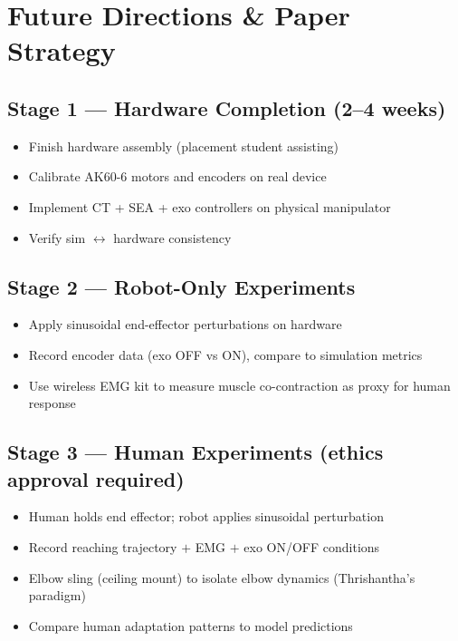 \documentclass[11pt, a4paper]{article}
\begin{document}
\section{Future Directions \& Paper Strategy}

\subsection{Stage 1 --- Hardware Completion (2--4 weeks)}
\begin{itemize}[nosep]
  \item Finish hardware assembly (placement student assisting)
  \item Calibrate AK60-6 motors and encoders on real device
  \item Implement CT + SEA + exo controllers on physical manipulator
  \item Verify sim $\leftrightarrow$ hardware consistency
\end{itemize}

\subsection{Stage 2 --- Robot-Only Experiments}
\begin{itemize}[nosep]
  \item Apply sinusoidal end-effector perturbations on hardware
  \item Record encoder data (exo OFF vs ON), compare to simulation metrics
  \item Use wireless EMG kit to measure muscle co-contraction as proxy for human response
\end{itemize}

\subsection{Stage 3 --- Human Experiments (ethics approval required)}
\begin{itemize}[nosep]
  \item Human holds end effector; robot applies sinusoidal perturbation
  \item Record reaching trajectory $+$ EMG $+$ exo ON/OFF conditions
  \item Elbow sling (ceiling mount) to isolate elbow dynamics (Thrishantha's paradigm)
  \item Compare human adaptation patterns to model predictions
\end{itemize}
\end{document}
